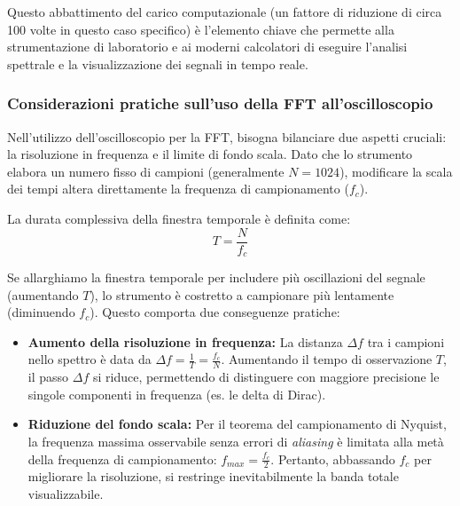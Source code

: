 Questo abbattimento del carico computazionale (un fattore di riduzione di circa 100 volte in questo caso specifico) è l'elemento chiave che permette alla strumentazione di laboratorio e ai moderni calcolatori di eseguire l'analisi spettrale e la visualizzazione dei segnali in tempo reale.

\subsubsection{Considerazioni pratiche sull'uso della FFT all'oscilloscopio}

Nell'utilizzo dell'oscilloscopio per la FFT, bisogna bilanciare due aspetti cruciali: la risoluzione in frequenza e il limite di fondo scala. Dato che lo strumento elabora un numero fisso di campioni (generalmente $N = 1024$), modificare la scala dei tempi altera direttamente la frequenza di campionamento ($f_c$). 

La durata complessiva della finestra temporale è definita come:
$$T = \frac{N}{f_c}$$

Se allarghiamo la finestra temporale per includere più oscillazioni del segnale (aumentando $T$), lo strumento è costretto a campionare più lentamente (diminuendo $f_c$). Questo comporta due conseguenze pratiche:

\begin{itemize}
    \item \textbf{Aumento della risoluzione in frequenza:} La distanza $\Delta f$ tra i campioni nello spettro è data da $\Delta f = \frac{1}{T} = \frac{f_c}{N}$. Aumentando il tempo di osservazione $T$, il passo $\Delta f$ si riduce, permettendo di distinguere con maggiore precisione le singole componenti in frequenza (es. le delta di Dirac).
    
    \item \textbf{Riduzione del fondo scala:} Per il teorema del campionamento di Nyquist, la frequenza massima osservabile senza errori di \textit{aliasing} è limitata alla metà della frequenza di campionamento: $f_{max} = \frac{f_c}{2}$. Pertanto, abbassando $f_c$ per migliorare la risoluzione, si restringe inevitabilmente la banda totale visualizzabile.
\end{itemize}

 

\pagebreak